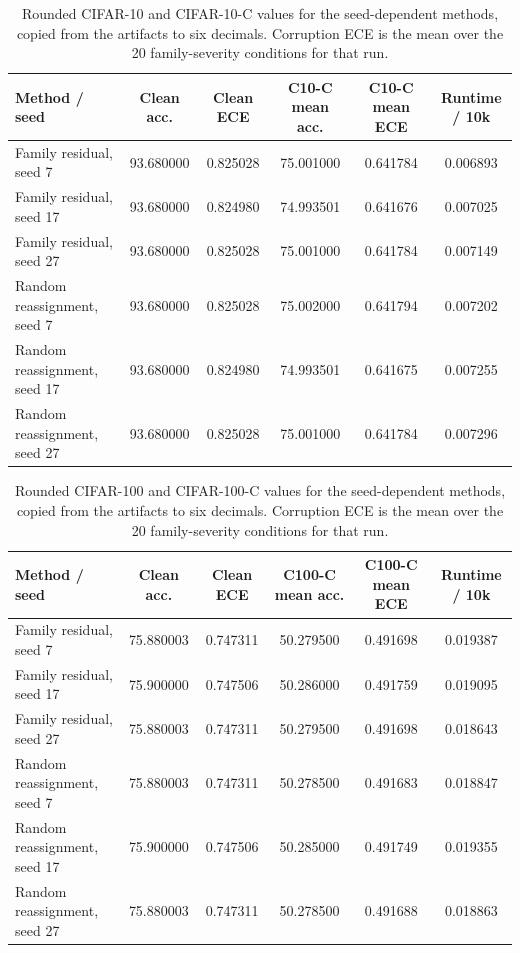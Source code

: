 \documentclass{article}
\begin{document}
\begin{table}[h]
\caption{Rounded CIFAR-10 and CIFAR-10-C values for the seed-dependent methods, copied from the artifacts to six decimals. Corruption ECE is the mean over the 20 family-severity conditions for that run.}
\label{tab:c10_seed_exact}
\centering
\scriptsize
\begin{tabular}{lccccc}
\toprule
Method / seed & Clean acc. & Clean ECE & C10-C mean acc. & C10-C mean ECE & Runtime / 10k \\
\midrule
Family residual, seed 7 & 93.680000 & 0.825028 & 75.001000 & 0.641784 & 0.006893 \\
Family residual, seed 17 & 93.680000 & 0.824980 & 74.993501 & 0.641676 & 0.007025 \\
Family residual, seed 27 & 93.680000 & 0.825028 & 75.001000 & 0.641784 & 0.007149 \\
Random reassignment, seed 7 & 93.680000 & 0.825028 & 75.002000 & 0.641794 & 0.007202 \\
Random reassignment, seed 17 & 93.680000 & 0.824980 & 74.993501 & 0.641675 & 0.007255 \\
Random reassignment, seed 27 & 93.680000 & 0.825028 & 75.001000 & 0.641784 & 0.007296 \\
\bottomrule
\end{tabular}
\end{table}

\begin{table}[h]
\caption{Rounded CIFAR-100 and CIFAR-100-C values for the seed-dependent methods, copied from the artifacts to six decimals. Corruption ECE is the mean over the 20 family-severity conditions for that run.}
\label{tab:c100_seed_exact}
\centering
\scriptsize
\begin{tabular}{lccccc}
\toprule
Method / seed & Clean acc. & Clean ECE & C100-C mean acc. & C100-C mean ECE & Runtime / 10k \\
\midrule
Family residual, seed 7 & 75.880003 & 0.747311 & 50.279500 & 0.491698 & 0.019387 \\
Family residual, seed 17 & 75.900000 & 0.747506 & 50.286000 & 0.491759 & 0.019095 \\
Family residual, seed 27 & 75.880003 & 0.747311 & 50.279500 & 0.491698 & 0.018643 \\
Random reassignment, seed 7 & 75.880003 & 0.747311 & 50.278500 & 0.491683 & 0.018847 \\
Random reassignment, seed 17 & 75.900000 & 0.747506 & 50.285000 & 0.491749 & 0.019355 \\
Random reassignment, seed 27 & 75.880003 & 0.747311 & 50.278500 & 0.491688 & 0.018863 \\
\bottomrule
\end{tabular}
\end{table}
\end{document}
